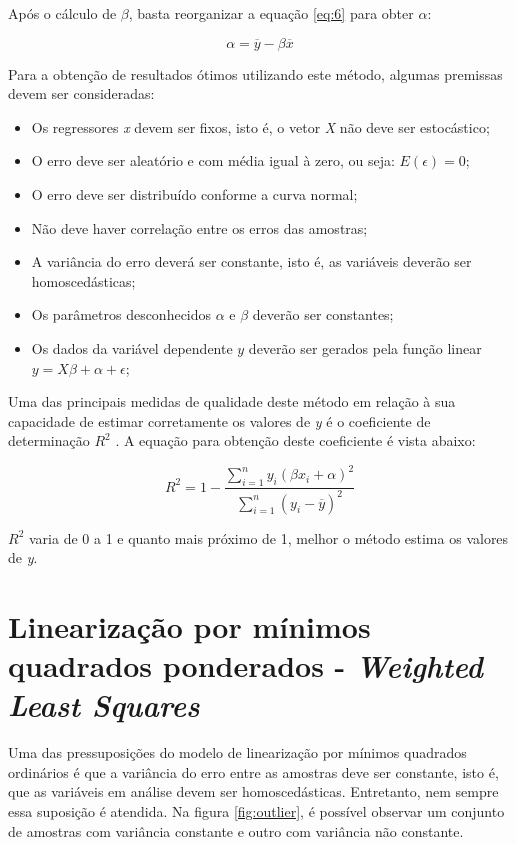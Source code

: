 Após o cálculo de $\beta$, basta reorganizar a equação \ref{eq:6} para obter $\alpha$:

\begin{equation}\label{eq:8}
  \alpha = \overline{y} - \beta \overline{x} 
\end{equation}

Para a obtenção de resultados ótimos utilizando este método, algumas premissas devem ser consideradas:

\begin{itemize}
  \item Os regressores \textit{x} devem ser fixos, isto é, o vetor \textit{X} não deve ser estocástico;
  \item O erro deve ser aleatório e com média igual à zero, ou seja: $E(\epsilon) = 0$;
  \item O erro deve ser distribuído conforme a curva normal;
  \item Não deve haver correlação entre os erros das amostras;
  \item A variância do erro deverá ser constante, isto é, as variáveis deverão ser homoscedásticas;
  \item Os parâmetros desconhecidos $\alpha$ e $\beta$ deverão ser constantes;
  \item Os dados da variável dependente $y$ deverão ser gerados pela função linear $y = X\beta + \alpha + \epsilon$;
\end{itemize}

Uma das principais medidas de qualidade deste método em relação à sua capacidade de estimar corretamente os valores de \textit{y} é o coeficiente de determinação $R^2$ \cite{ols_intro_econometrics} \cite{conciseenclyclopediaofstatistics}. A equação para obtenção deste coeficiente é vista abaixo:

\begin{equation}\label{eq:9}
R^2 = 1 - \frac{\sum_{i=1}^{n} y_i(\beta x_i + \alpha)^2}{\sum_{i=1}^{n} (y_i - \overline{y})^2}
\end{equation}

$R^2$ varia de 0 a 1 e quanto mais próximo de 1, melhor o método estima os valores de \textit{y}.

\section{Linearização por mínimos quadrados ponderados - \textit{Weighted Least Squares}}

Uma das pressuposições do modelo de linearização por mínimos quadrados ordinários é que a variância do erro entre as amostras deve ser constante, isto é, que as variáveis em análise devem ser homoscedásticas. Entretanto, nem sempre essa suposição é atendida. Na figura \ref{fig:outlier}, é possível observar um conjunto de amostras com variância constante e outro com variância não constante.

